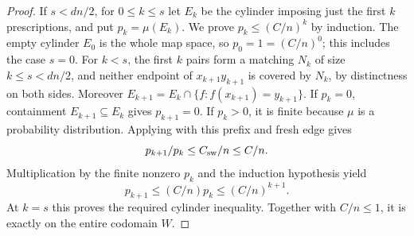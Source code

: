 \begin{proof}
If $s<dn/2$, for $0\leq k\leq s$ let $E_k$ be the cylinder imposing just
the first $k$ prescriptions, and put $p_k=\mu(E_k)$. We prove
$p_k\leq(C/n)^k$ by induction. The empty cylinder $E_0$ is the whole map
space, so $p_0=1=(C/n)^0$; this includes the case $s=0$.
For $k<s$, the first $k$ pairs form a matching $N_k$ of size
$k\leq s<dn/2$, and neither endpoint of $x_{k+1}y_{k+1}$ is covered by
$N_k$, by distinctness on both sides. Moreover
$E_{k+1}=E_k\cap\{f:f(x_{k+1})=y_{k+1}\}$.
If $p_k=0$, containment $E_{k+1}\subseteq E_k$ gives $p_{k+1}=0$.
If $p_k>0$, it is finite because $\mu$ is a probability distribution.
Applying  with this prefix and fresh edge gives
\[
 p_{k+1}/p_k\leq C_{\rm sw}/n\leq C/n.
\]
Multiplication by the finite nonzero $p_k$ and the induction hypothesis yield
\[
 p_{k+1}\leq(C/n)p_k\leq(C/n)^{k+1}.
\]
At $k=s$ this proves the required cylinder inequality. Together with
$C/n\leq1$, it is exactly  on the entire codomain $W$.
\end{proof}
